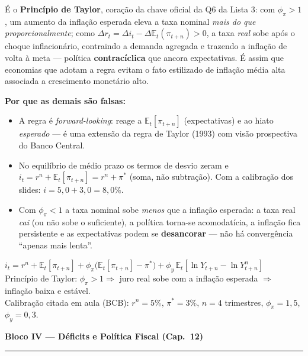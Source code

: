\documentclass[12pt, a4paper]{article}
\newcommand{\E}{\mathbb{E}}
\begin{document}
\begin{correctbox}[title={Resposta correta: c)}]
É o \textbf{Princípio de Taylor}, coração da chave oficial da Q6 da Lista 3:
com $\phi_\pi > 1$, um aumento da inflação esperada eleva a taxa nominal
\emph{mais do que proporcionalmente}; como
$\Delta r_t = \Delta i_t - \Delta \E_t(\pi_{t+n}) > 0$, a taxa \emph{real} sobe
após o choque inflacionário, contraindo a demanda agregada e trazendo a
inflação de volta à meta --- política \textbf{contracíclica} que ancora
expectativas. É assim que economias que adotam a regra evitam o fato estilizado
de inflação média alta associada a crescimento monetário alto. \checkmark

\textbf{Por que as demais são falsas:}
\begin{itemize}[leftmargin=*]
\item[a)] A regra é \emph{forward-looking}: reage a $\E_t[\pi_{t+n}]$
(expectativas) e ao hiato \emph{esperado} --- é uma extensão da regra de Taylor
(1993) com visão prospectiva do Banco Central.
\item[b)] No equilíbrio de médio prazo os termos de desvio zeram e
$i_t = r^n + \E_t[\pi_{t+n}] = r^n + \pi^*$ (soma, não subtração). Com a
calibração dos slides: $i = 5{,}0 + 3{,}0 = 8{,}0\%$.
\item[d)] Com $\phi_\pi < 1$ a taxa nominal sobe \emph{menos} que a inflação
esperada: a taxa real \emph{cai} (ou não sobe o suficiente), a política
torna-se acomodatícia, a inflação fica persistente e as expectativas podem se
\textbf{desancorar} --- não há convergência ``apenas mais lenta''.
\end{itemize}
\end{correctbox}

\begin{formulabox}[title={Para memorizar (chave da Lista 3, Q6)}]
$i_t = r^n + \E_t[\pi_{t+n}] + \phi_\pi\bigl(\E_t[\pi_{t+n}] - \pi^*\bigr)
+ \phi_y\,\E_t[\ln Y_{t+n} - \ln Y^n_{t+n}]$\\[0.3em]
Princípio de Taylor: $\phi_\pi > 1 \Rightarrow$ juro real sobe com a inflação
esperada $\Rightarrow$ inflação baixa e estável.\\
Calibração citada em aula (BCB): $r^n = 5\%$, $\pi^* = 3\%$, $n = 4$ trimestres,
$\phi_\pi = 1{,}5$, $\phi_y = 0{,}3$.
\end{formulabox}

\newpage
\begin{center}
{\large\bfseries\color{cyanrbc} Bloco IV --- Déficits e Política Fiscal (Cap.\ 12)}\\[0.2em]
\rule{\linewidth}{0.6pt}
\end{center}
\end{document}
